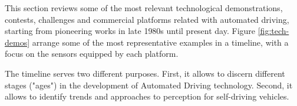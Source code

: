 

This section reviews some of the most relevant technological demonstrations,
contests, challenges and commercial platforms related with automated driving, 
starting from pioneering works in late 1980s until present day. Figure 
\ref{fig:tech-demos} arrange some of the most representative examples in a 
timeline, with a focus on the sensors equipped by each platform.

The timeline serves two different purposes. 
First, it allows to discern different stages ("ages") in the development of
Automated Driving technology. 
Second, it allows to identify trends and approaches to perception for
self-driving vehicles.



